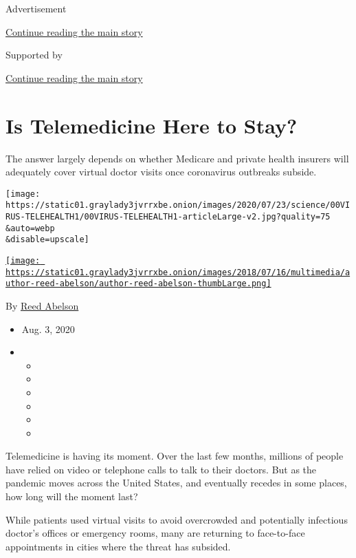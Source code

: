 Advertisement

\protect\hyperlink{after-top}{Continue reading the main story}

Supported by

\protect\hyperlink{after-sponsor}{Continue reading the main story}

\hypertarget{is-telemedicine-here-to-stay}{%
\section{Is Telemedicine Here to
Stay?}\label{is-telemedicine-here-to-stay}}

The answer largely depends on whether Medicare and private health
insurers will adequately cover virtual doctor visits once coronavirus
outbreaks subside.

\texttt{[image: https://static01.graylady3jvrrxbe.onion/images/2020/07/23/science/00VIRUS-TELEHEALTH1/00VIRUS-TELEHEALTH1-articleLarge-v2.jpg?quality=75\\\&auto=webp\\\&disable=upscale]}

\href{https://www.nytimes3xbfgragh.onion/by/reed-abelson}{\texttt{[image: https://static01.graylady3jvrrxbe.onion/images/2018/07/16/multimedia/author-reed-abelson/author-reed-abelson-thumbLarge.png]}}

By \href{https://www.nytimes3xbfgragh.onion/by/reed-abelson}{Reed
Abelson}

\begin{itemize}
\item
  Aug. 3, 2020
\item
  \begin{itemize}
  \item
  \item
  \item
  \item
  \item
  \item
  \end{itemize}
\end{itemize}

Telemedicine is having its moment. Over the last few months, millions of
people have relied on video or telephone calls to talk to their doctors.
But as the pandemic moves across the United States, and eventually
recedes in some places, how long will the moment last?

While patients used virtual visits to avoid overcrowded and potentially
infectious doctor's offices or emergency rooms, many are returning to
face-to-face appointments in cities where the threat has subsided.

